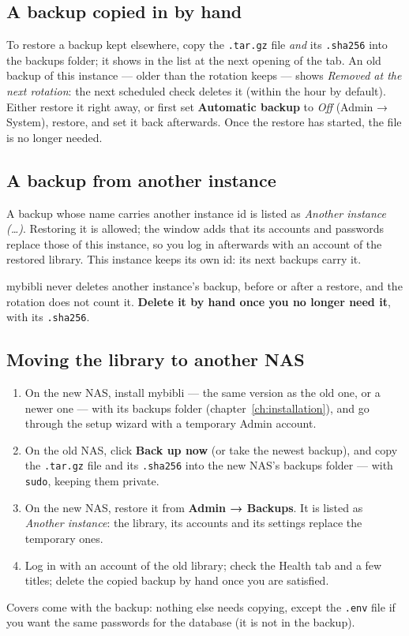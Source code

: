 \subsection*{A backup copied in by hand}

To restore a backup kept elsewhere, copy the \texttt{.tar.gz} file
\emph{and} its \texttt{.sha256} into the backups folder; it shows in
the list at the next opening of the tab. An old backup of this
instance --- older than the rotation keeps --- shows \emph{Removed at
the next rotation}: the next scheduled check deletes it (within the
hour by default). Either restore it right away, or first set
\textbf{Automatic backup} to \emph{Off} (Admin → System), restore, and
set it back afterwards. Once the restore has started, the file is no
longer needed.

\subsection*{A backup from another instance}

A backup whose name carries another instance id is listed as
\emph{Another instance (\dots)}. Restoring it is allowed; the window
adds that its accounts and passwords replace those of this instance,
so you log in afterwards with an account of the restored library. This
instance keeps its own id: its next backups carry it.

mybibli never deletes another instance's backup, before or after a
restore, and the rotation does not count it. \textbf{Delete it by hand
once you no longer need it}, with its \texttt{.sha256}.

\subsection*{Moving the library to another NAS}
\label{sec:backups-move}

\begin{enumerate}
  \item On the new NAS, install mybibli --- the same version as the old
        one, or a newer one --- with its backups folder
        (chapter~\ref{ch:installation}), and go through the setup
        wizard with a temporary Admin account.
  \item On the old NAS, click \textbf{Back up now} (or take the newest
        backup), and copy the \texttt{.tar.gz} file and its
        \texttt{.sha256} into the new NAS's backups folder --- with
        \texttt{sudo}, keeping them private.
  \item On the new NAS, restore it from \textbf{Admin → Backups}. It is
        listed as \emph{Another instance}: the library, its accounts
        and its settings replace the temporary ones.
  \item Log in with an account of the old library; check the Health
        tab and a few titles; delete the copied backup by hand once you
        are satisfied.
\end{enumerate}
Covers come with the backup: nothing else needs copying, except the
\texttt{.env} file if you want the same passwords for the database
(it is not in the backup).

